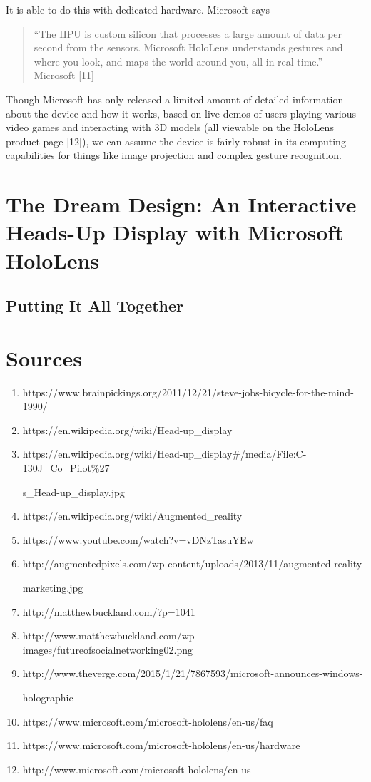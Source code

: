 \documentclass[a4paper,12pt]{article}
\begin{document}
It is able to do this with dedicated hardware. Microsoft says

\begin{quote}
    ``The HPU is custom silicon that processes a large amount of data per second from the sensors. Microsoft HoloLens understands gestures and where you look, and maps the world around you, all in real time.'' - Microsoft [11]
\end{quote}

Though Microsoft has only released a limited amount of detailed information about the device and how it works, based on live demos of users playing various video games and interacting with 3D models (all viewable on the HoloLens product page [12]), we can assume the device is fairly robust in its computing capabilities for things like image projection and complex gesture recognition. 

\section{The Dream Design: An Interactive Heads-Up Display with Microsoft HoloLens}

\subsection{Putting It All Together}



\section{Sources}


\begin{enumerate}
    \item https://www.brainpickings.org/2011/12/21/steve-jobs-bicycle-for-the-mind-1990/
    \item https://en.wikipedia.org/wiki/Head-up\_display
    \item https://en.wikipedia.org/wiki/Head-up\_display\#/media/File:C-130J\_Co\_Pilot\%27

    s\_Head-up\_display.jpg
    \item https://en.wikipedia.org/wiki/Augmented\_reality
    \item https://www.youtube.com/watch?v=vDNzTasuYEw
    \item http://augmentedpixels.com/wp-content/uploads/2013/11/augmented-reality-

    marketing.jpg
    \item http://matthewbuckland.com/?p=1041
    \item http://www.matthewbuckland.com/wp-images/futureofsocialnetworking02.png
    \item http://www.theverge.com/2015/1/21/7867593/microsoft-announces-windows-

    holographic
	\item https://www.microsoft.com/microsoft-hololens/en-us/faq
	\item https://www.microsoft.com/microsoft-hololens/en-us/hardware
    \item http://www.microsoft.com/microsoft-hololens/en-us
\end{enumerate}
\end{document}
